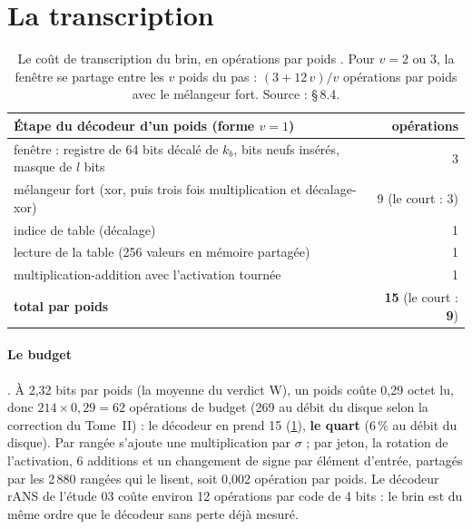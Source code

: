 \section{La transcription}\label{t3gen:sec:transcription}

\begin{table}[tbp]
\centering\small
\begin{tabular}{l r}
\toprule
Étape du décodeur d'un poids (forme $v = 1$) & opérations \\
\midrule
fenêtre : registre de 64 bits décalé de $k_b$, bits neufs insérés, masque de $l$ bits & 3 \\
mélangeur fort (xor, puis trois fois multiplication et décalage-xor) & 9 (le court : 3) \\
indice de table (décalage) & 1 \\
lecture de la table (256 valeurs en mémoire partagée) & 1 \\
multiplication-addition avec l'activation tournée & 1 \\
\midrule
\textbf{total par poids} & \textbf{15} (le court : \textbf{9}) \\
\bottomrule
\end{tabular}
\caption[Le coût de transcription du brin]{Le coût de transcription du brin, en opérations par poids \calc. Pour $v = 2$ ou 3, la fenêtre se partage entre les $v$ poids du pas : $(3 + 12\,v)/v$ opérations par poids avec le mélangeur fort. Source :  §\,8.4.}
\label{t3gen:tab:transcription}
\end{table}

\paragraph{Le budget} \calc. À 2,32 bits par poids (la moyenne du verdict W), un poids coûte 0,29 octet lu, donc $214 \times 0{,}29 = 62$ opérations de budget (269 au débit du disque selon la correction du Tome~II) : le décodeur en prend 15 (\cref{t3gen:tab:transcription}), \textbf{le quart} (6\,\% au débit du disque). Par rangée s'ajoute une multiplication par $\sigma$ ; par jeton, la rotation de l'activation, 6 additions et un changement de signe par élément d'entrée, partagés par les 2\,880 rangées qui le lisent, soit 0,002 opération par poids. Le décodeur rANS de l'étude 03 coûte environ 12 opérations par code de 4 bits : le brin est du même ordre que le décodeur sans perte déjà mesuré.

